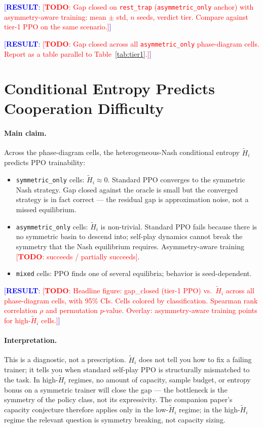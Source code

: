 \documentclass{article}
\newcommand{\TODO}[1]{\textcolor{red}{[\textbf{TODO}: #1]}}
\newcommand{\RESULT}[1]{\textcolor{blue}{[\textbf{RESULT}: #1]}}
\begin{document}
\RESULT{\TODO{Gap closed on \texttt{rest\_trap} (\texttt{asymmetric\_only}
anchor) with asymmetry-aware training: mean $\pm$ std, $n$ seeds, verdict
tier.  Compare against tier-1 PPO on the same scenario.}}

\RESULT{\TODO{Gap closed across all \texttt{asymmetric\_only} phase-diagram
cells.  Report as a table parallel to Table~\ref{tab:tier1}.}}

\section{Conditional Entropy Predicts Cooperation Difficulty}
\label{sec:prediction}

\paragraph{Main claim.}
Across the phase-diagram cells, the heterogeneous-Nash conditional entropy
$\tilde{H}_i$ predicts PPO trainability:
\begin{itemize}
  \item \texttt{symmetric\_only} cells: $\tilde{H}_i \approx 0$.  Standard PPO
    converges to the symmetric Nash strategy.  Gap closed against the oracle
    is small but the converged strategy is in fact correct — the residual gap
    is approximation noise, not a missed equilibrium.
  \item \texttt{asymmetric\_only} cells: $\tilde{H}_i$ is non-trivial.  Standard
    PPO fails because there is no symmetric basin to descend into; self-play
    dynamics cannot break the symmetry that the Nash equilibrium requires.
    Asymmetry-aware training \TODO{succeeds / partially succeeds}.
  \item \texttt{mixed} cells: PPO finds one of several equilibria; behavior
    is seed-dependent.
\end{itemize}

\RESULT{\TODO{Headline figure: gap\_closed (tier-1 PPO) vs.\ $\tilde{H}_i$
across all phase-diagram cells, with 95\% CIs.  Cells colored by
classification.  Spearman rank correlation $\rho$ and permutation $p$-value.
Overlay: asymmetry-aware training points for high-$\tilde{H}_i$ cells.}}

\paragraph{Interpretation.}
This is a diagnostic, not a prescription.  $\tilde{H}_i$ does not tell you how
to fix a failing trainer; it tells you when standard self-play PPO is
structurally mismatched to the task.  In high-$\tilde{H}_i$ regimes, no amount
of capacity, sample budget, or entropy bonus on a symmetric trainer will close
the gap — the bottleneck is the symmetry of the policy class, not its
expressivity.  The companion paper's capacity conjecture
\cite{walters2026slepianwolf} therefore applies only in the low-$\tilde{H}_i$
regime; in the high-$\tilde{H}_i$ regime the relevant question is symmetry
breaking, not capacity sizing.
\end{document}
